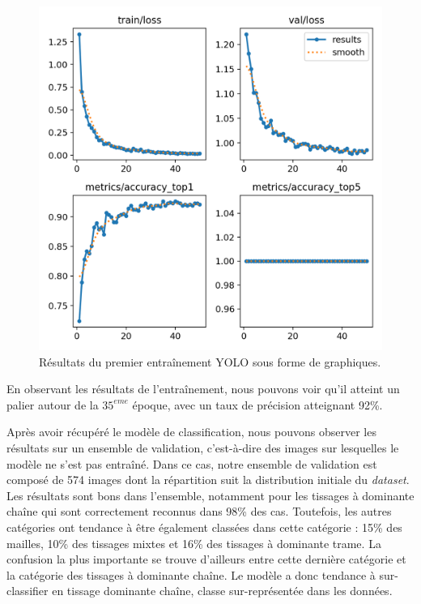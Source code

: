 \begin{figure}[!h]
	\begin{center}
		\includegraphics[width=12cm]{../images/YOLO_result50epoch.png}
		\caption{Résultats du premier entraînement YOLO sous forme de graphiques.}
	 \end{center}
\end{figure}

\noindent En observant les résultats de l'entraînement, nous pouvons voir qu'il atteint un palier autour de la $35^{eme}$ époque, avec un taux de précision atteignant 92\%.

Après avoir récupéré le modèle de classification, nous pouvons observer les résultats sur un ensemble de validation, c'est-à-dire des images sur lesquelles le modèle ne s'est pas entraîné. Dans ce cas, notre ensemble de validation est composé de 574 images dont la répartition suit la distribution initiale du \textit{dataset}. Les résultats sont bons dans l'ensemble, notamment pour les tissages à dominante chaîne qui sont correctement reconnus dans 98\% des cas. Toutefois, les autres catégories ont tendance à être également classées dans cette catégorie : 15\% des mailles, 10\% des tissages mixtes et 16\% des tissages à dominante trame. La confusion la plus importante se trouve d'ailleurs entre cette dernière catégorie et la catégorie des tissages à dominante chaîne. Le modèle a donc tendance à sur-classifier en tissage dominante chaîne, classe sur-représentée dans les données.

